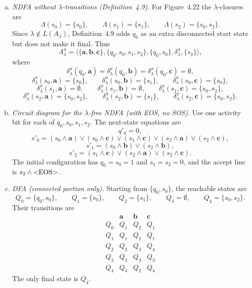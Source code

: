 \begin{enumerate}[{4.}1.]
\begin{enumerate}[(a)]
  \item \emph{NDFA without $\lambda$-transitions (Definition~4.9).}
  For Figure~4.22 the $\lambda$-closures are
  \[
    \Lambda(s_0)=\{s_0\},\qquad
    \Lambda(s_1)=\{s_1\},\qquad
    \Lambda(s_2)=\{s_0,s_2\}.
  \]
  Since $\lambda\notin L(A_\lambda)$, Definition~4.9 adds $q_0$ as an extra
  disconnected start state but does not make it final.  Thus
  \[
    A^{\sigma}_\lambda=
    \langle\{\pmb{a},\pmb{b},\pmb{c}\},\{q_0,s_0,s_1,s_2\},\{q_0,s_0\},
    \delta^{\sigma}_\lambda,\{s_2\}\rangle,
  \]
  where
  \[
    \delta^{\sigma}_\lambda(q_0,\pmb{a})=
    \delta^{\sigma}_\lambda(q_0,\pmb{b})=
    \delta^{\sigma}_\lambda(q_0,\pmb{c})=\emptyset,
  \]
  \[
    \delta^{\sigma}_\lambda(s_0,\pmb{a})=\{s_0\},\qquad
    \delta^{\sigma}_\lambda(s_0,\pmb{b})=\{s_1\},\qquad
    \delta^{\sigma}_\lambda(s_0,\pmb{c})=\{s_0\},
  \]
  \[
    \delta^{\sigma}_\lambda(s_1,\pmb{a})=\emptyset,\qquad
    \delta^{\sigma}_\lambda(s_1,\pmb{b})=\emptyset,\qquad
    \delta^{\sigma}_\lambda(s_1,\pmb{c})=\{s_0,s_2\},
  \]
  \[
    \delta^{\sigma}_\lambda(s_2,\pmb{a})=\{s_0,s_2\},\qquad
    \delta^{\sigma}_\lambda(s_2,\pmb{b})=\{s_1\},\qquad
    \delta^{\sigma}_\lambda(s_2,\pmb{c})=\{s_0,s_2\}.
  \]

  \item \emph{Circuit diagram for the $\lambda$-free NDFA (with EOS, no SOS).}
  Use one activity bit for each of $q_0,s_0,s_1,s_2$.  The next-state
  equations are
  \[
    q'_0=0,
  \]
  \[
    s'_0=(s_0\wedge \pmb{a})\vee(s_0\wedge \pmb{c})
        \vee(s_1\wedge \pmb{c})\vee(s_2\wedge \pmb{a})\vee(s_2\wedge \pmb{c}),
  \]
  \[
    s'_1=(s_0\wedge \pmb{b})\vee(s_2\wedge \pmb{b}),
  \]
  \[
    s'_2=(s_1\wedge \pmb{c})\vee(s_2\wedge \pmb{a})\vee(s_2\wedge \pmb{c}).
  \]
  The initial configuration has $q_0=s_0=1$ and $s_1=s_2=0$, and the accept
  line is $s_2\wedge\text{\text{\textless}EOS\text{\textgreater}}$.

  \item \emph{DFA (connected portion only).}
  Starting from $\{q_0,s_0\}$, the reachable states are
  \[
    Q_0=\{q_0,s_0\},\qquad
    Q_1=\{s_0\},\qquad
    Q_2=\{s_1\},\qquad
    Q_3=\emptyset,\qquad
    Q_4=\{s_0,s_2\}.
  \]
  Their transitions are
  \[
  \begin{array}{c|ccc}
   & \pmb{a} & \pmb{b} & \pmb{c}\\\hline
  Q_0 & Q_1 & Q_2 & Q_1\\
  Q_1 & Q_1 & Q_2 & Q_1\\
  Q_2 & Q_3 & Q_3 & Q_4\\
  Q_3 & Q_3 & Q_3 & Q_3\\
  Q_4 & Q_4 & Q_2 & Q_4
  \end{array}
  \]
  The only final state is $Q_4$.
\end{enumerate}


\end{enumerate}
